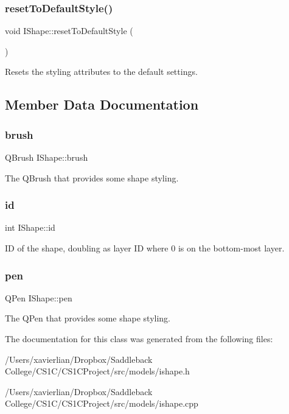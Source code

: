 \mbox{\label{class_i_shape_a3f1e70475296c2e897df28a7facb5bad}} 
\subsubsection{\texorpdfstring{resetToDefaultStyle()}{resetToDefaultStyle()}}
{\footnotesize\ttfamily void I\+Shape\+::reset\+To\+Default\+Style (\begin{DoxyParamCaption}{ }\end{DoxyParamCaption})}



Resets the styling attributes to the default settings. 



\subsection{Member Data Documentation}
\mbox{\label{class_i_shape_a3827e9f0c3c88331ceaa3bb9b00f7073}} 
\subsubsection{\texorpdfstring{brush}{brush}}
{\footnotesize\ttfamily Q\+Brush I\+Shape\+::brush}

The Q\+Brush that provides some shape styling. \mbox{\label{class_i_shape_a6ff2d631831c1079b88eeebc8ac65bb0}} 
\subsubsection{\texorpdfstring{id}{id}}
{\footnotesize\ttfamily int I\+Shape\+::id}

ID of the shape, doubling as layer ID where 0 is on the bottom-\/most layer. \mbox{\label{class_i_shape_ab185a01c9703b4db801b54030031a9c6}} 
\subsubsection{\texorpdfstring{pen}{pen}}
{\footnotesize\ttfamily Q\+Pen I\+Shape\+::pen}

The Q\+Pen that provides some shape styling. 

The documentation for this class was generated from the following files\+:\begin{DoxyCompactItemize}
\item 
/\+Users/xavierlian/\+Dropbox/\+Saddleback College/\+C\+S1\+C/\+C\+S1\+C\+Project/src/models/ishape.\+h\item 
/\+Users/xavierlian/\+Dropbox/\+Saddleback College/\+C\+S1\+C/\+C\+S1\+C\+Project/src/models/ishape.\+cpp\end{DoxyCompactItemize}
